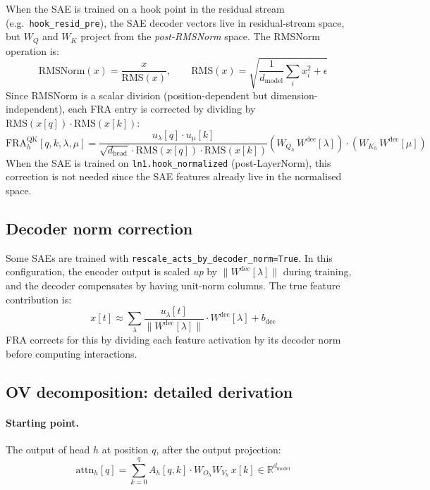 \documentclass{article}
\theoremstyle{plain}
\theoremstyle{definition}
\theoremstyle{remark}
\newcommand{\Wdec}{W^{\mathrm{dec}}}
\newcommand{\WQ}{W_Q}
\newcommand{\WK}{W_K}
\newcommand{\dmodel}{d_{\mathrm{model}}}
\newcommand{\dhead}{d_{\mathrm{head}}}
\newcommand{\ulambda}{u_\lambda}
\newcommand{\umu}{u_\mu}
\newcommand{\RR}{\mathbb{R}}
\begin{document}
When the SAE is trained on a hook point in the residual stream (e.g.\ \texttt{hook\_resid\_pre}), the SAE decoder vectors live in residual-stream space, but $\WQ$ and $\WK$ project from the \emph{post-RMSNorm} space. The RMSNorm operation is:
\begin{equation}
    \mathrm{RMSNorm}(x) = \frac{x}{\mathrm{RMS}(x)}, \qquad \mathrm{RMS}(x) = \sqrt{\frac{1}{\dmodel} \sum_i x_i^2 + \epsilon}
\end{equation}
Since RMSNorm is a scalar division (position-dependent but dimension-independent), each FRA entry is corrected by dividing by $\mathrm{RMS}(x[q]) \cdot \mathrm{RMS}(x[k])$:
\begin{equation}
    \mathrm{FRA}^{\mathrm{QK}}_h[q,k,\lambda,\mu] = \frac{\ulambda[q] \cdot \umu[k]}{\sqrt{\dhead} \cdot \mathrm{RMS}(x[q]) \cdot \mathrm{RMS}(x[k])} \left( W_{Q_h}\,\Wdec[\lambda] \right) \cdot \left( W_{K_h}\,\Wdec[\mu] \right)
\end{equation}
When the SAE is trained on \texttt{ln1.hook\_normalized} (post-LayerNorm), this correction is not needed since the SAE features already live in the normalised space.

\subsection{Decoder norm correction}
\label{app:dec_norm}

Some SAEs are trained with \texttt{rescale\_acts\_by\_decoder\_norm=True}. In this configuration, the encoder output is scaled \emph{up} by $\|\Wdec[\lambda]\|$ during training, and the decoder compensates by having unit-norm columns. The true feature contribution is:
\begin{equation}
    x[t] \approx \sum_\lambda \frac{\ulambda[t]}{\|\Wdec[\lambda]\|} \cdot \Wdec[\lambda] + b_{\mathrm{dec}}
\end{equation}
FRA corrects for this by dividing each feature activation by its decoder norm before computing interactions.

\subsection{OV decomposition: detailed derivation}
\label{app:ov_derivation}

\paragraph{Starting point.} The output of head $h$ at position $q$, after the output projection:
\begin{equation}
    \mathrm{attn}_h[q] = \sum_{k=0}^{q} A_h[q,k] \cdot W_{O_h} W_{V_h}\, x[k] \in \RR^{\dmodel}
\end{equation}
\end{document}
